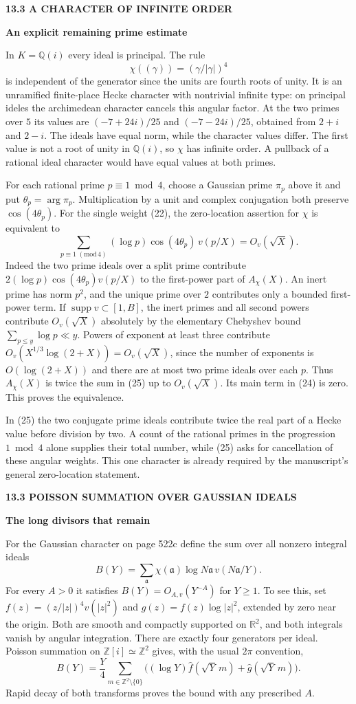 \documentclass[11pt,letterpaper]{article}
\newcommand{\rightmarktext}{}
\newcommand{\printfolio}{}
\newcommand{\leaf}[4]{\clearpage\gdef\printfolio{#1}\gdef\rightmarktext{#2}%
  {\small\sffamily\bfseries\color{ink}#3\par}\vspace{3pt}%
  {\LARGE\bfseries #4\par}\vspace{5pt}}
\newcommand{\R}{\mathbb R}
\newcommand{\Q}{\mathbb Q}
\newcommand{\Z}{\mathbb Z}
\DeclareMathOperator{\supp}{supp}
\begin{document}
\leaf{522c}{Gaussian primes}{13.3 \quad A CHARACTER OF INFINITE ORDER}{An explicit remaining prime estimate}
In $K=\Q(i)$ every ideal is principal. The rule
\[
 \chi((\gamma))=(\gamma/|\gamma|)^4
\]
is independent of the generator since the units are fourth roots of
unity. It is an unramified finite-place Hecke character with nontrivial
infinite type: on principal ideles the archimedean character cancels
this angular factor. At the two primes over $5$ its values are
$(-7+24i)/25$ and $(-7-24i)/25$, obtained from $2+i$ and $2-i$.
The ideals have equal norm, while the character values differ. The first
value is not a root of unity in $\Q(i)$, so $\chi$ has infinite order.
A pullback of a rational ideal character would have equal values at
both primes.

For each rational prime $p\equiv1\bmod4$, choose a Gaussian prime
$\pi_p$ above it and put $\theta_p=\arg\pi_p$. Multiplication by a unit
and complex conjugation both preserve $\cos(4\theta_p)$. For the single
weight (22), the zero-location assertion for $\chi$ is equivalent to
\[
 \boxed{\displaystyle
 \sum_{p\equiv1\;(\mathrm{mod}\,4)}(\log p)\cos(4\theta_p)\,v(p/X)
                   =O_v(\sqrt X).}
 \tag{25}
\]
Indeed the two prime ideals over a split prime contribute
$2(\log p)\cos(4\theta_p)v(p/X)$ to the first-power part of $A_\chi(X)$.
An inert prime has norm $p^2$, and the unique prime over $2$ contributes
only a bounded first-power term. If $\supp v\subset[1,B]$, the inert
primes and all second powers contribute $O_v(\sqrt X)$ absolutely by the
elementary Chebyshev bound $\sum_{p\le y}\log p\ll y$. Powers of exponent
at least three contribute
$O_v(X^{1/3}\log(2+X))=O_v(\sqrt X)$, since the number of exponents
is $O(\log(2+X))$ and there are at most two prime ideals over each $p$.
Thus $A_\chi(X)$ is twice the sum in (25) up to $O_v(\sqrt X)$.
Its main term in (24) is zero. This proves the equivalence.

In (25) the two conjugate prime ideals contribute twice the real part
of a Hecke value before division by two. A count
of the rational primes in the progression $1\bmod4$ alone supplies
their total number, while (25) asks for cancellation of these angular
weights. This one character is already required by the manuscript's
general zero-location statement.

\leaf{522d}{Gaussian primes}{13.3 \quad POISSON SUMMATION OVER GAUSSIAN IDEALS}{The long divisors that remain}
For the Gaussian character on page 522c define the sum over all nonzero
integral ideals
\[
 B(Y)=\sum_{\mathfrak a}\chi(\mathfrak a)\log N\mathfrak a\,
                    v(N\mathfrak a/Y).
\]
For every $A>0$ it satisfies $B(Y)=O_{A,v}(Y^{-A})$ for $Y\ge1$.
To see this, set $f(z)=(z/|z|)^4v(|z|^2)$ and
$g(z)=f(z)\log|z|^2$, extended by zero near the origin. Both are smooth
and compactly supported on $\R^2$, and both integrals vanish by angular
integration. There are exactly four generators per ideal. Poisson
summation on $\Z[i]\simeq\Z^2$ gives, with the usual $2\pi$ convention,
\[
 B(Y)=\frac{Y}{4}\sum_{m\in\Z^2\setminus\{0\}}
       \big((\log Y)\widehat f(\sqrt Y\,m)+\widehat g(\sqrt Y\,m)\big).
\]
Rapid decay of both transforms proves the bound with any prescribed $A$.
\end{document}
